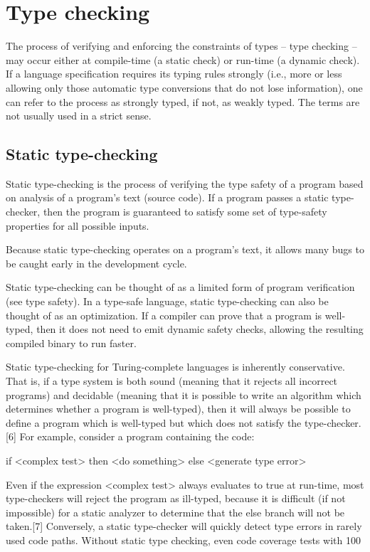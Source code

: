 \documentclass[12pt,b5paper]{book}
\theoremstyle{definition}
\begin{document}
\section{Type checking}

The process of verifying and enforcing the constraints of types – type checking – may occur either at compile-time (a static check) or run-time (a dynamic check). If a language specification requires its typing rules strongly (i.e., more or less allowing only those automatic type conversions that do not lose information), one can refer to the process as strongly typed, if not, as weakly typed. The terms are not usually used in a strict sense.

\subsection{Static type-checking}

Static type-checking is the process of verifying the type safety of a program based on analysis of a program's text (source code). If a program passes a static type-checker, then the program is guaranteed to satisfy some set of type-safety properties for all possible inputs.

Because static type-checking operates on a program's text, it allows many bugs to be caught early in the development cycle.

Static type-checking can be thought of as a limited form of program verification (see type safety). In a type-safe language, static type-checking can also be thought of as an optimization. If a compiler can prove that a program is well-typed, then it does not need to emit dynamic safety checks, allowing the resulting compiled binary to run faster.

Static type-checking for Turing-complete languages is inherently conservative. That is, if a type system is both sound (meaning that it rejects all incorrect programs) and decidable (meaning that it is possible to write an algorithm which determines whether a program is well-typed), then it will always be possible to define a program which is well-typed but which does not satisfy the type-checker.[6] For example, consider a program containing the code:

if <complex test> then <do something> else <generate type error>

Even if the expression <complex test> always evaluates to true at run-time, most type-checkers will reject the program as ill-typed, because it is difficult (if not impossible) for a static analyzer to determine that the else branch will not be taken.[7] Conversely, a static type-checker will quickly detect type errors in rarely used code paths. Without static type checking, even code coverage tests with 100%
\end{document}
